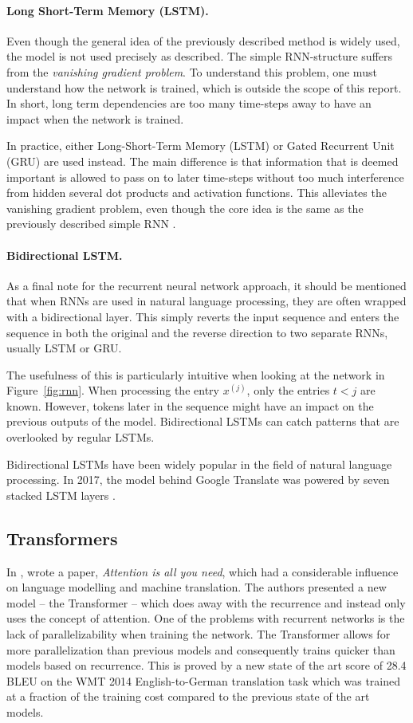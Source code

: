 \paragraph{Long Short-Term Memory (LSTM).}
Even though the general idea of the previously described method is widely used, the model is not used precisely as described. The simple RNN-structure suffers from the \textit{vanishing gradient problem}. To understand this problem, one must understand how the network is trained, which is outside the scope of this report. In short, long term dependencies are too many time-steps away to have an impact when the network is trained. 

In practice, either Long-Short-Term Memory (LSTM) or Gated Recurrent Unit (GRU) are used instead. The main difference is that information that is deemed important is allowed to pass on to later time-steps without too much interference from hidden several dot products and activation functions. This alleviates the vanishing gradient problem, even though the core idea is the same as the previously described simple RNN \citep{chollet2017deep}.

\paragraph{Bidirectional LSTM.}
As a final note for the recurrent neural network approach, it should be mentioned that when RNNs are used in natural language processing, they are often wrapped with a bidirectional layer. This simply reverts the input sequence and enters the sequence in both the original and the reverse direction to two separate RNNs, usually LSTM or GRU. 

The usefulness of this is particularly intuitive when looking at the network in Figure~\ref{fig:rnn}. When processing the entry $x^{(j)}$, only the entries $t < j$ are known. However, tokens later in the sequence might have an impact on the previous outputs of the model. Bidirectional LSTMs can catch patterns that are overlooked by regular LSTMs.

Bidirectional LSTMs have been widely popular in the field of natural language processing. In 2017, the model behind Google Translate was powered by seven stacked LSTM layers \citep{chollet2017deep}. 

\subsection{Transformers}\label{sec:trfmod}
In \citeyear{NIPS2017_7181}, \citeauthor{NIPS2017_7181} wrote a paper, \textit{Attention is all you need}, which had a considerable influence on language modelling and machine translation. The authors presented a new model -- the Transformer -- which does away with the recurrence and instead only uses the concept of attention. One of the problems with recurrent networks is the lack of parallelizability when training the network. The Transformer allows for more parallelization than previous models and consequently trains quicker than models based on recurrence. This is proved by a new state of the art score of 28.4 BLEU on the WMT 2014 English-to-German translation task which was trained at a fraction of the training cost compared to the previous state of the art models. 


